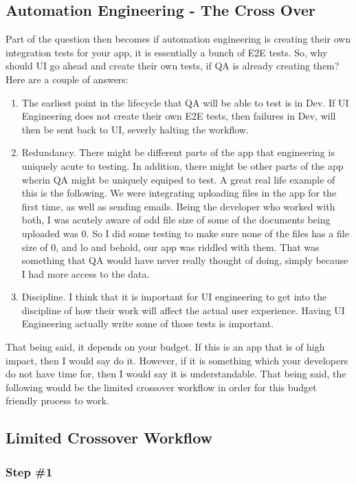 \subsection{ Automation Engineering - The Cross Over }
Part of the question then becomes if automation engineering is creating their
own integration tests for your app, it is essentially a bunch of E2E tests. So,
why should UI go ahead and create their own tests, if QA is already creating
them? Here are a couple of answers:
\begin{enumerate}
  \item The earliest point in the lifecycle that QA will be able to test is in
  Dev. If UI Engineering does not create their own E2E tests, then failures in
  Dev, will then be sent back to UI, severly halting the workflow.
  \item Redundancy. There might be different parts of the app that engineering
  is uniquely acute to testing. In addition, there might be other parts of the
  app wherin QA might be uniquely equiped to test. A great real life example of
  this is the following. We were integrating uploading files in the app for the
  first time, as well as sending emails. Being the developer who worked with
  both, I was acutely aware of odd file size of some of the documents being
  uploaded was 0. So I did some testing to make sure none of the files has a
  file size of 0, and lo and behold, our app was riddled with them. That was
  something that QA would have never really thought of doing, simply because I
  had more access to the data.
  \item Discipline. I think that it is important for UI engineering to get into
  the discipline of how their work will affect the actual user experience.
  Having UI Engineering actually write some of those tests is important.
\end{enumerate}

That being said, it depends on your budget. If this is an app that is of high
impact, then I would say do it. However, if it is something which your developers
do not have time for, then I would say it is understandable. That being said,
the following would be the limited crossover workflow in order for this budget
friendly process to work.

\subsection{Limited Crossover Workflow}
\subsubsection{Step \#1}

